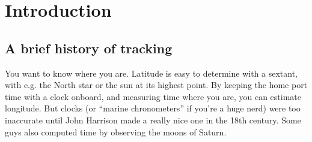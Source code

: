 \section{Introduction}

\subsection{A brief history of tracking}

You want to know where you are. Latitude is easy to determine with a sextant, with e.g. the North star or the sun at its highest point. By keeping the home port time with a clock onboard, and measuring time where you are, you can estimate longitude. But clocks (or ``marine chronometers'' if you're a huge nerd) were too inaccurate until John Harrison made a really nice one in the 18th century. Some guys also computed time by observing the moons of Saturn.

				